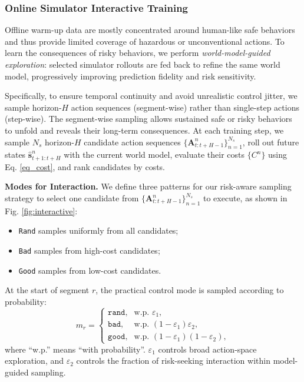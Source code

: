 \documentclass[twocolumn]{template}
\theoremstyle{thmstyleone}%
\theoremstyle{thmstyletwo}%
\theoremstyle{thmstylethree}%
\begin{document}
\subsubsection{Online Simulator Interactive Training}
Offline warm-up data are mostly concentrated around human-like safe behaviors and thus provide limited coverage of hazardous or unconventional actions.
To learn the consequences of risky behaviors, we perform \emph{world-model-guided exploration}:
selected simulator rollouts are fed back to refine the same world model,
progressively improving prediction fidelity and risk sensitivity.

Specifically,
to ensure temporal continuity and avoid unrealistic control jitter,
we sample horizon-$H$ action sequences (segment-wise) rather than single-step actions (step-wise).
The segment-wise sampling allows sustained safe or risky behaviors to unfold and reveals their long-term consequences.
At each training step,
we sample $N_s$ horizon-$H$ candidate action sequences $\{\mathbf{A}^n_{t:t+H-1}\}_{n=1}^{N_s}$,
roll out future states $\hat{\mathbf{s}}^{n}_{t+1:t+H}$ with the current world model,
evaluate their costs $\{C^n\}$ using Eq. \eqref{eq_cost}, and rank candidates by costs.

\noindent
\textbf{Modes for Interaction.} We define three patterns for our risk-aware sampling strategy to select one candidate from $\{\mathbf{A}^n_{t:t+H-1}\}_{n=1}^{N_s}$ to execute, as shown in Fig. \ref{fig:interactive}:
\begin{itemize}
\item \texttt{Rand} samples uniformly from all candidates;
\item \texttt{Bad} samples from high-cost candidates;
\item \texttt{Good} samples from low-cost candidates.
\end{itemize}
At the start of segment $r$,
the practical control mode is sampled according to probability:
\begin{equation}
m_r =
\begin{cases}
\texttt{rand}, & \text{w.p. } \varepsilon_1,\\
\texttt{bad},  & \text{w.p. } (1-\varepsilon_1)\varepsilon_2,\\
\texttt{good}, & \text{w.p. } (1-\varepsilon_1)(1-\varepsilon_2),
\end{cases}
\end{equation}
where ``w.p.'' means ``with probability''. $\varepsilon_1$ controls broad action-space exploration, and $\varepsilon_2$ controls the fraction of risk-seeking interaction within model-guided sampling.
\end{document}
